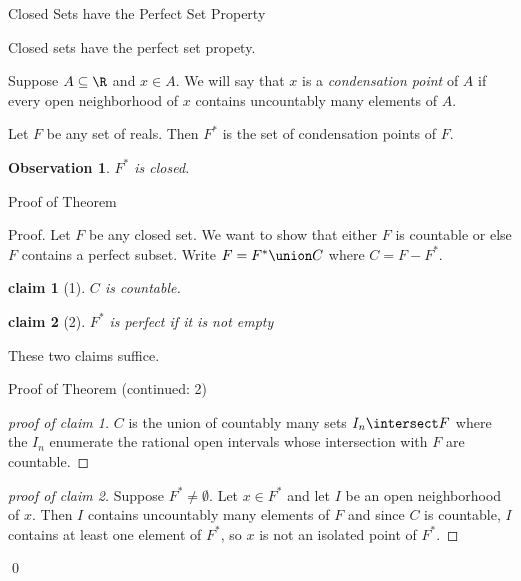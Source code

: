 \documentclass{beamer}
\newtheorem*{claim}{claim}
\newtheorem*{observation}{Observation}
\newenvironment*{subproof}[1][Proof]
{\begin{proof}[#1]}{\renewcommand{\qedsymbol}{$\diamondsuit$} \end{proof}}
\begin{document}
\begin{frame}{Closed Sets have the Perfect Set Property}

\begin{theorem}
Closed sets have the perfect set propety.
\end{theorem}

\begin{definition}
Suppose $A\subseteq \R$ and $x\in A$. We will say that $x$ is a
\emph{condensation point} of $A$ if every open neighborhood of $x$ contains
uncountably many elements of $A$.
\end{definition}

\begin{definition}
Let $F$ be any set of reals. Then $F^*$ is the set of condensation points
of $F$.
\end{definition}

\begin{observation}
$F^*$ is closed.
\end{observation}

\end{frame}

\begin{frame}{Proof of Theorem}
\begin{block}{Proof.}
Let $F$ be any closed set. We want to show that either $F$ is countable or
else $F$ contains a perfect subset.  Write $F = F^* \union C$ where
$C=F-F^*$.

\begin{claim}[1]
$C$ is countable.
\end{claim}

\begin{claim}[2]
$F^*$ is perfect if it is not empty
\end{claim}

\pause

These two claims suffice.

\end{block}

\end{frame}

\begin{frame}{Proof of Theorem (continued: 2)}
\begin{subproof}[proof of claim 1]
$C$ is the union of countably many sets $I_n \intersect F$ where the
$I_n$ enumerate the rational open intervals whose intersection
with $F$ are countable.
\end{subproof}

\begin{subproof}[proof of claim 2]
Suppose $F^* \neq \emptyset.$ Let $x\in F^*$ and let $I$ be an open
neighborhood of $x$. Then $I$ contains uncountably many elements of $F$ and
since $C$ is countable, $I$ contains at least one element of $F^*$, so $x$
is not an isolated point of $F^*$.
\end{subproof}

\qed

\end{frame}
\end{document}
